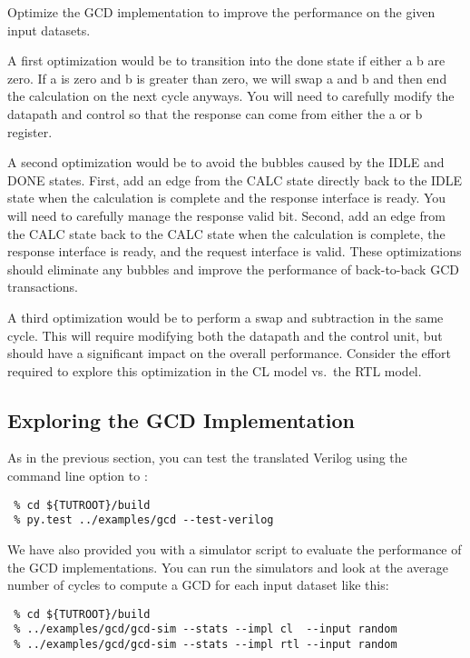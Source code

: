 \documentclass{cbxdoc}
\begin{document}
\begin{task}
  Optimize the GCD implementation to improve the performance on the given
  input datasets.

  A first optimization would be to transition into the done state if
  either a  b are zero. If a is zero and b is greater than zero,
  we will swap a and b and then end the calculation on the next cycle
  anyways. You will need to carefully modify the datapath and control so
  that the response can come from either the a or b register.

  A second optimization would be to avoid the bubbles caused by the IDLE
  and DONE states. First, add an edge from the CALC state directly back
  to the IDLE state when the calculation is complete and the response
  interface is ready. You will need to carefully manage the response
  valid bit. Second, add an edge from the CALC state back to the CALC
  state when the calculation is complete, the response interface is
  ready, and the request interface is valid. These optimizations should
  eliminate any bubbles and improve the performance of back-to-back GCD
  transactions.

  A third optimization would be to perform a swap and subtraction in the
  same cycle. This will require modifying both the datapath and the
  control unit, but should have a significant impact on the overall
  performance. Consider the effort required to explore this optimization
  in the CL model vs.~the RTL model.
\end{task}

\subsection{Exploring the GCD Implementation}

As in the previous section, you can test the translated Verilog using the
 command line option to :

\begin{verbatim}
 % cd ${TUTROOT}/build
 % py.test ../examples/gcd --test-verilog
\end{verbatim}

We have also provided you with a simulator script to evaluate the
performance of the GCD implementations. You can run the simulators and
look at the average number of cycles to compute a GCD for each input
dataset like this:

\begin{verbatim}
 % cd ${TUTROOT}/build
 % ../examples/gcd/gcd-sim --stats --impl cl  --input random
 % ../examples/gcd/gcd-sim --stats --impl rtl --input random
\end{verbatim}
\end{document}

